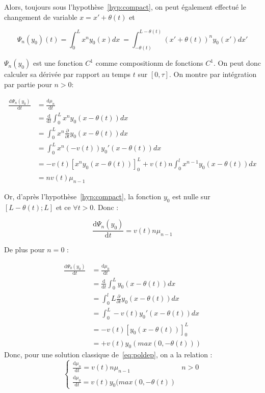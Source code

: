 \documentclass[a4paper]{article}
\begin{document}
  
Alors, toujours sous l'hypothèse~\eqref{hyp:compact}, on peut également effectué le changement de variable $x =x'+\theta(t)$ et
  
\[ \Psi_n (y_0) (t) = \int_0^L x^n y_0(x) dx\ = \int_{-\theta(t)}^{L - \theta(t)} (x'+\theta(t))^ny_0(x')dx'\]
  
$\Psi_n (y_0)$ est une fonction $C^1$ comme compositionm de fonctions $C^1$.
On peut donc calculer sa dérivée par rapport au temps $t$ sur $[0,\tau]$.
On montre par intégration par partie pour $n>0$:
  
\[
\begin{split}
	\frac{\mathrm{d} \Psi_n (y_0) }{\mathrm{d}t} &= \frac{\mathrm{d} \mu_n }{\mathrm{d}t} \\
                                                 &= \frac{\mathrm{d}}{\mathrm{d}t}\int_0^L x^n y_0(x-\theta(t)) dx \\
	                                             &= \int_0^L x^n \frac{\partial}{\partial t}y_0(x-\theta(t)) dx \\
												 &= \int_0^L x^n (-v(t))y_0'(x-\theta(t)) dx \\
												 &= -v(t)[x^n y_0(x-\theta(t))]_0^L + v(t) n \int_0^l x^{n-1} y_0(x-\theta(t)) dx\\
												 &= n v(t) \mu_{n-1}
\end{split}
\]

Or, d'après l'hypothèse~\eqref{hyp:compact}, la fonction $y_0$ est nulle sur $[L-\theta(t);L]$ et ce $\forall t >0$. Donc :

\[\frac{\mathrm{d} \Psi_n (y_0) }{\mathrm{d}t}= v(t) n \mu_{n-1}\]

De plus pour $n=0$ :

\[ 
\begin{split}
\frac{\mathrm{d} \Psi_0 (y_0) }{\mathrm{d}t} &= \frac{\mathrm{d} \mu_0 }{\mathrm{d}t} \\
                                             &= \frac{\mathrm{d}}{\mathrm{d}t}\int_0^L y_0(x-\theta(t)) dx \\
	                                         &= \int_0^lL\frac{\partial}{\partial t}y_0(x-\theta(t)) dx \\
											 &= \int_0^L -v(t)y_0'(x-\theta(t)) dx \\
											 &= -v(t)[y_0(x-\theta(t))]_0^L  \\
											 &= + v(t) y_0(max(0,-\theta(t))) 
\end{split}
\]
Donc, pour une solution classique de~\eqref{eq:poldep}, on a la relation : 
\begin{equation}
	\label{eq:mmt}
\begin{cases}
\displaystyle \frac{\mathrm{d} \mu_n }{\mathrm{d}t} = v(t) n \mu_{n-1} & n>0 \\
\displaystyle \frac{\mathrm{d} \mu_0 }{\mathrm{d}t} = v(t) y_0(max(0,-\theta(t))
\end{cases}
\end{equation}
\end{document}
